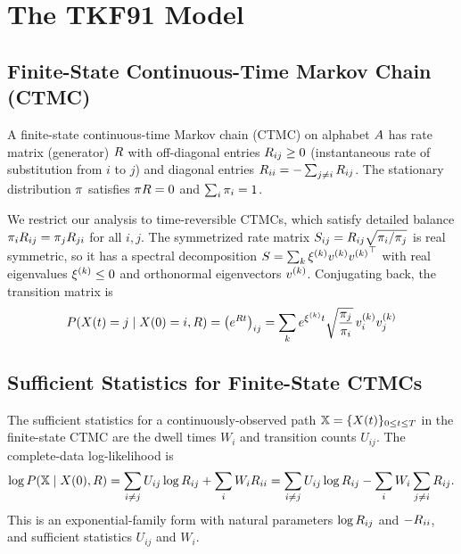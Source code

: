 \section{The TKF91 Model}

\subsection{Finite-State Continuous-Time Markov Chain (CTMC)}

A finite-state continuous-time Markov chain (CTMC) on alphabet $A$ has rate matrix (generator) $R$
with off-diagonal entries $R_{ij} \geq 0$ (instantaneous rate of substitution from $i$ to $j$)
and diagonal entries $R_{ii} = -\sum_{j \neq i} R_{ij}$.
The stationary distribution $\pi$ satisfies $\pi R = 0$ and $\sum_i \pi_i = 1$.

We restrict our analysis to time-reversible CTMCs, which satisfy detailed balance
$\pi_i R_{ij} = \pi_j R_{ji}$ for all $i,j$.
The symmetrized rate matrix $S_{ij} = R_{ij}\sqrt{\pi_i/\pi_j}$ is real symmetric,
so it has a spectral decomposition $S = \sum_k \xi^{(k)} v^{(k)} {v^{(k)}}^\top$
with real eigenvalues $\xi^{(k)} \leq 0$ and orthonormal eigenvectors $v^{(k)}$.
Conjugating back, the transition matrix is
\[
P(X(t) = j \mid X(0) = i, R) =
\left( e^{R t} \right)_{ij} = \sum_k e^{\xi^{(k)} t} \sqrt{\frac{\pi_j}{\pi_i}}\, v^{(k)}_i v^{(k)}_j
\]


\subsection{Sufficient Statistics for Finite-State CTMCs}
\label{sec:bridge-expectations}

The sufficient statistics for a continuously-observed path $\mathbb{X} = \{X(t)\}_{0 \leq t \leq T}$ in the finite-state CTMC
are the dwell times $W_i$ and transition counts $U_{ij}$.
The complete-data log-likelihood is
\begin{equation}\label{eq:ctmc-complete}
\log P(\mathbb{X} \mid X(0), R) = \sum_{i \neq j} U_{ij} \log R_{ij} + \sum_i W_i R_{ii}
= \sum_{i \neq j} U_{ij} \log R_{ij} - \sum_i W_i \sum_{j \neq i} R_{ij}.
\end{equation}
This is an exponential-family form with natural parameters $\log R_{ij}$ and $-R_{ii}$,
and sufficient statistics $U_{ij}$ and $W_i$.

